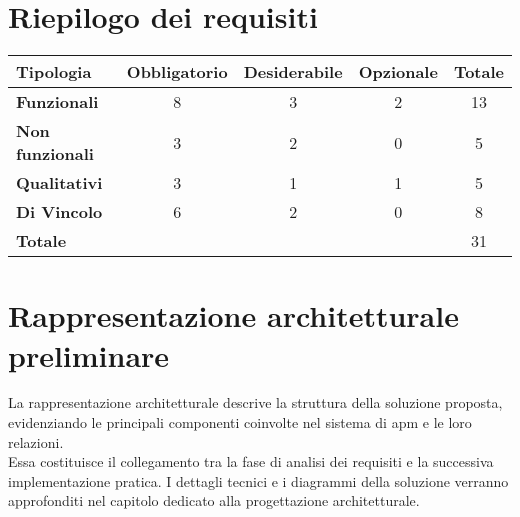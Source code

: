 \newpage
\section{Riepilogo dei requisiti}

\begin{center}
\label{tab:requisiti-riepilogo}
\begin{tabular}{|l|c|c|c|c|}
\hline
\rowcolor[gray]{0.8}
\textbf{Tipologia} & \textbf{Obbligatorio} & \textbf{Desiderabile} & \textbf{Opzionale} & \textbf{Totale} \\
\hline
\textbf{Funzionali} & 8 & 3 & 2 & 13 \\
\hline

\hline
\textbf{Non funzionali} & 3 & 2 & 0 & 5 \\
\hline

\hline
\textbf{Qualitativi} & 3 & 1 & 1 & 5 \\
\hline

\hline
\textbf{Di Vincolo} & 6 & 2 & 0 & 8 \\
\hline

\hline
\textbf{Totale} &  &  &  & 31 \\
\hline

\end{tabular}
\end{center}

\newpage
\section{Rappresentazione architetturale preliminare}
La rappresentazione architetturale descrive la struttura della soluzione proposta, evidenziando le principali componenti coinvolte nel sistema di \gls{apm} e le loro relazioni. \\
Essa costituisce il collegamento tra la fase di analisi dei requisiti e la successiva implementazione pratica. I dettagli tecnici e i diagrammi della soluzione verranno approfonditi nel capitolo dedicato alla progettazione architetturale.


